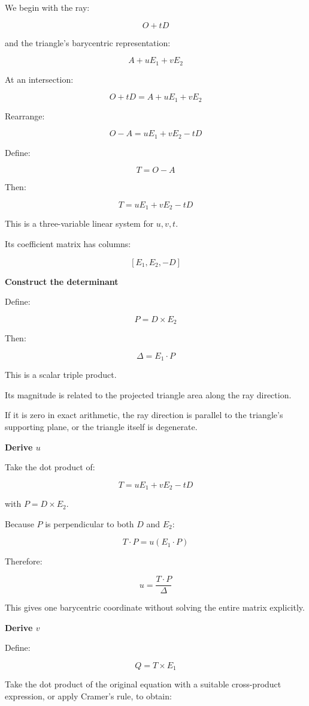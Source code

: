 We begin with the ray:

\[
O+tD
\]

and the triangle's barycentric representation:

\[
A+uE_1+vE_2
\]

At an intersection:

\[
O+tD=A+uE_1+vE_2
\]

Rearrange:

\[
O-A=uE_1+vE_2-tD
\]

Define:

\[
T=O-A
\]

Then:

\[
\boxed{ T=uE_1+vE_2-tD }
\]

This is a three-variable linear system for \(u,v,t\).

Its coefficient matrix has columns:

\[
[E_1,E_2,-D]
\]

\textbf{Construct the determinant}

Define:

\[
\boxed{ P=D\times E_2 }
\]

Then:

\[
\boxed{ \Delta=E_1\cdot P }
\]

This is a scalar triple product.

Its magnitude is related to the projected triangle area along the ray direction.

If it is zero in exact arithmetic, the ray direction is parallel to the triangle's supporting plane, or the triangle itself is degenerate.

\textbf{Derive \(u\)}

Take the dot product of:

\[
T=uE_1+vE_2-tD
\]

with \(P=D\times E_2\).

Because \(P\) is perpendicular to both \(D\) and \(E_2\):

\[
T\cdot P=u(E_1\cdot P)
\]

Therefore:

\[
\boxed{ u=\frac{T\cdot P}{\Delta} }
\]

This gives one barycentric coordinate without solving the entire matrix explicitly.

\textbf{Derive \(v\)}

Define:

\[
\boxed{ Q=T\times E_1 }
\]

Take the dot product of the original equation with a suitable cross-product expression, or apply Cramer's rule, to obtain:

